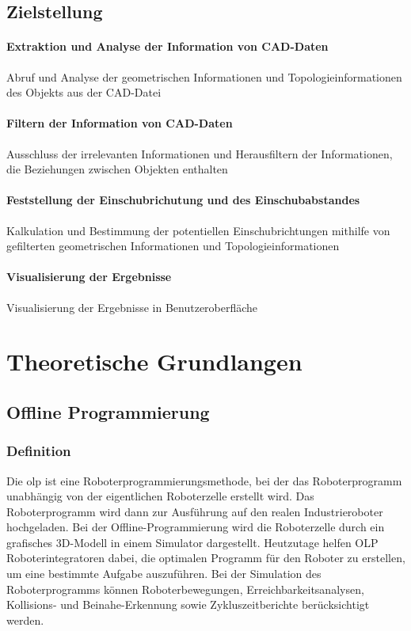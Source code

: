 \documentclass[14pt,a4paper,titlepage]{article}
\begin{document}
	\subsection{Zielstellung}
	\paragraph{Extraktion und Analyse der Information von CAD-Daten}
	
	Abruf und Analyse der geometrischen Informationen und Topologieinformationen des Objekts aus der CAD-Datei
	\paragraph{Filtern der Information von CAD-Daten}

	Ausschluss der irrelevanten Informationen und Herausfiltern der Informationen, die Beziehungen zwischen Objekten enthalten
	
	\paragraph{Feststellung der Einschubrichutung und des Einschubabstandes}
	Kalkulation und Bestimmung der potentiellen Einschubrichtungen mithilfe von gefilterten geometrischen Informationen und Topologieinformationen  
	
	\paragraph{Visualisierung der Ergebnisse}
	Visualisierung der Ergebnisse in Benutzeroberfläche
	\pagebreak
	\section{Theoretische Grundlangen}
	\subsection{Offline Programmierung}
	\subsubsection{Definition}
	Die \acf{olp} ist eine Roboterprogrammierungsmethode, bei der das Roboterprogramm unabhängig von der eigentlichen Roboterzelle erstellt wird. Das Roboterprogramm wird dann zur Ausführung auf den realen Industrieroboter hochgeladen. Bei der Offline-Programmierung wird die Roboterzelle durch ein grafisches 3D-Modell in einem Simulator dargestellt. Heutzutage helfen OLP Roboterintegratoren dabei, die optimalen Programm für den Roboter zu erstellen, um eine bestimmte Aufgabe auszuführen. Bei der Simulation des Roboterprogramms können Roboterbewegungen, Erreichbarkeitsanalysen, Kollisions- und Beinahe-Erkennung sowie Zykluszeitberichte berücksichtigt werden.\cite{offline-programming}
	\bigbreak
\end{document}
